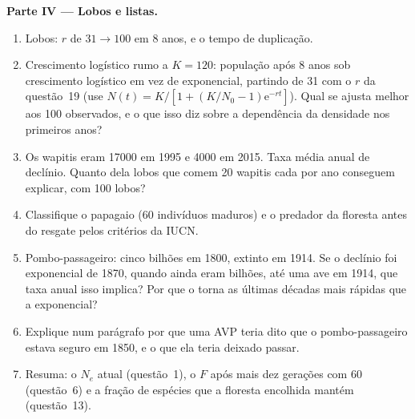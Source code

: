 \begin{problem}
\medskip
\noindent\textbf{Parte IV --- Lobos e listas.}
\begin{enumerate}[resume]
  \item Lobos: $r$ de $31 \to 100$ em 8 anos, e o tempo de duplicação.
  \item Crescimento logístico rumo a $K = 120$: população após 8 anos sob
        crescimento logístico em vez de exponencial, partindo de 31 com o
        $r$ da questão~19 (use $N(t) = K/[1 + (K/N_{0} -
        1)\mathrm{e}^{-rt}]$). Qual se ajusta melhor aos 100 observados, e
        o que isso diz sobre a dependência da densidade nos primeiros
        anos?
  \item Os wapitis eram \num{17000} em 1995 e \num{4000} em 2015. Taxa
        média anual de declínio. Quanto dela lobos que comem \num{20}
        wapitis cada por ano conseguem explicar, com 100 lobos?
  \item Classifique o papagaio (60 indivíduos maduros) e o predador da
        floresta antes do resgate pelos critérios da IUCN.
  \item Pombo-passageiro: cinco bilhões em 1800, extinto em 1914. Se o
        declínio foi exponencial de 1870, quando ainda eram bilhões, até
        uma ave em 1914, que taxa anual isso implica? Por que o  torna as últimas décadas mais rápidas que a exponencial?
  \item Explique num parágrafo por que uma AVP teria dito que o
        pombo-passageiro estava seguro em 1850, e o que ela teria
        deixado passar.
  \item Resuma: o $N_{e}$ atual (questão~1), o $F$ após mais dez gerações
        com 60 (questão~6) e a fração de espécies que a floresta encolhida
        mantém (questão~13).
\end{enumerate}
\end{problem}
